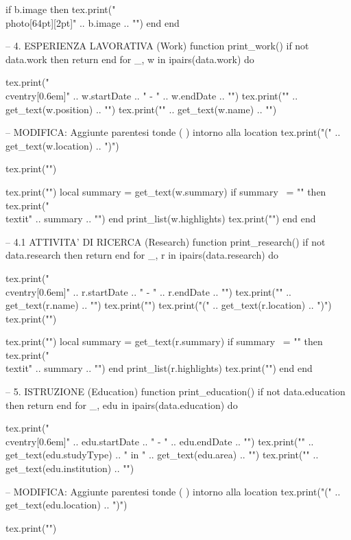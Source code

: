 \begin{luacode*}
    if b.image then
    tex.print("\\photo[64pt][2pt]{" .. b.image .. "}")
    end
    end

    -- 4. ESPERIENZA LAVORATIVA (Work)
    function print_work()
    if not data.work then return end
    for _, w in ipairs(data.work) do

    tex.print("\\cventry[0.6em]{" .. w.startDate .. " - " .. w.endDate .. "}")
    tex.print("{" .. get_text(w.position) .. "}")
    tex.print("{" .. get_text(w.name) .. "}")

    -- MODIFICA: Aggiunte parentesi tonde ( ) intorno alla location
    tex.print("{(" .. get_text(w.location) .. ")}")

    tex.print("{}")

    tex.print("{")
    local summary = get_text(w.summary)
    if summary ~= "" then
    tex.print("\\textit{" .. summary .. "}")
    end
    print_list(w.highlights)
    tex.print("}")
    end
    end

    -- 4.1 ATTIVITA' DI RICERCA (Research)
    function print_research()
    if not data.research then return end
    for _, r in ipairs(data.research) do

    tex.print("\\cventry[0.6em]{" .. r.startDate .. " - " .. r.endDate .. "}")
    tex.print("{" .. get_text(r.name) .. "}")
    tex.print("{}")
    tex.print("{(" .. get_text(r.location) .. ")}")
    tex.print("{}")

    tex.print("{")
    local summary = get_text(r.summary)
    if summary ~= "" then
    tex.print("\\textit{" .. summary .. "}")
    end
    print_list(r.highlights)
    tex.print("}")
    end
    end

    -- 5. ISTRUZIONE (Education)
    function print_education()
    if not data.education then return end
    for _, edu in ipairs(data.education) do

    tex.print("\\cventry[0.6em]{" .. edu.startDate .. " - " .. edu.endDate .. "}")
    tex.print("{" .. get_text(edu.studyType) .. " in " .. get_text(edu.area) .. "}")
    tex.print("{" .. get_text(edu.institution) .. "}")

    -- MODIFICA: Aggiunte parentesi tonde ( ) intorno alla location
    tex.print("{(" .. get_text(edu.location) .. ")}")

    tex.print("{}")


\end{luacode*}
